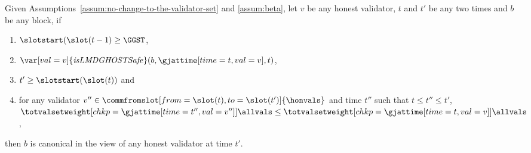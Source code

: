 \documentclass{article}
\begin{document}
\begin{lemma}\label{lem:condition-on-q-implies-safety-ex}
    Given Assumptions~\ref{assum:no-change-to-the-validator-set} and \ref{assum:beta},
    let $v$ be any honest validator,
    $t$ and $t'$ be any two times and
    $b$ be any block,
    if
    \begin{enumerate}
        \item $\slotstart(\slot(t-1) \geq \GGST$,
        \item  $\var[val=v]{\mathit{isLMDGHOSTSafe}}(b,\gjattime[time=t,val=v],t)$,
        \item $t' \geq \slotstart(\slot(t))$ and
        \item for any validator $v'' \in \commfromslot[from=\slot(t),to=\slot(t')]{\honvals}$ and time $t''$ such that $t \leq t'' \leq t'$, $\totvalsetweight[chkp={\gjattime[time=t'',val=v'']}]{\allvals} \leq \totvalsetweight[chkp={\gjattime[time=t,val=v]}]{\allvals}$,
    \end{enumerate}

    then $b$ is canonical in the view of any honest validator at time $t'$.
\end{lemma}
\end{document}
